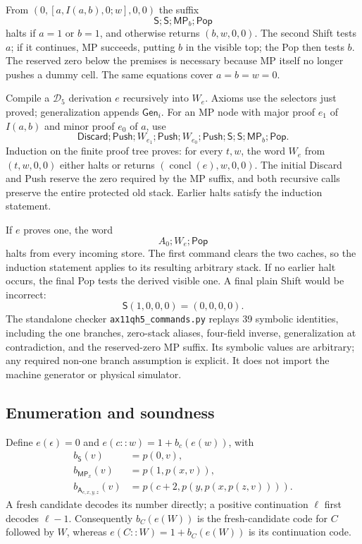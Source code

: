 From $(0,[a,I(a,b),0;w],0,0)$ the suffix
\[
                  \mathsf S;\mathsf S;\mathsf{MP}_b;\mathsf{Pop}
\]
halts if $a=1$ or $b=1$, and otherwise returns $(b,w,0,0)$. The second
Shift tests $a$; if it continues, MP succeeds, putting $b$ in the visible
top; the Pop then tests $b$. The reserved zero below the premises is
necessary because MP itself no longer pushes a dummy cell. The same
equations cover $a=b=w=0$.

Compile a $\mathcal D_5$ derivation $e$ recursively into $W_e$. Axioms use
the selectors just proved; generalization appends $\mathsf{Gen}_i$. For an
MP node with major proof $e_1$ of $I(a,b)$ and minor proof $e_0$ of $a$, use
\[
 \mathsf{Discard};\mathsf{Push};W_{e_1};\mathsf{Push};
 W_{e_0};\mathsf{Push};\mathsf S;\mathsf S;
                   \mathsf{MP}_b;\mathsf{Pop}.
\]
Induction on the finite proof tree proves: for every $t,w$, the word
$W_e$ from $(t,w,0,0)$ either halts or returns
$(\operatorname{concl}(e),w,0,0)$. The initial Discard and Push reserve
the zero required by the MP suffix, and both recursive calls preserve the
entire protected old stack. Earlier halts satisfy the induction statement.

If $e$ proves one, the word
\[
                         A_0;W_e;\mathsf{Pop}
\]
halts from every incoming store. The first command clears the two caches,
so the induction statement applies to its resulting arbitrary stack. If
no earlier halt occurs, the final Pop tests the derived visible one.
A final plain Shift would be incorrect:
\[
               \mathsf S(1,0,0,0)=(0,0,0,0).
\]
The standalone checker \texttt{ax11qh5\_commands.py} replays 39 symbolic
identities, including the one branches, zero-stack aliases, four-field
inverse, generalization at contradiction, and the reserved-zero MP suffix.
Its symbolic values are arbitrary; any required non-one branch assumption
is explicit. It does not import the machine generator or physical simulator.

\subsection{Enumeration and soundness}

Define $e(\epsilon)=0$ and $e(c::w)=1+b_c(e(w))$, with
\[
\begin{aligned}
 b_{\mathsf S}(v)&=p(0,v),\\
 b_{\mathsf{MP}_x}(v)&=p(1,p(x,v)),\\
 b_{\mathsf A_{c,x,y,z}}(v)&=p(c+2,p(y,p(x,p(z,v)))).
\end{aligned}
\]
A fresh candidate decodes its number directly; a positive continuation
$\ell$ first decodes $\ell-1$. Consequently $b_C(e(W))$ is the fresh-candidate
code for $C$ followed by $W$, whereas $e(C::W)=1+b_C(e(W))$ is its
continuation code.

